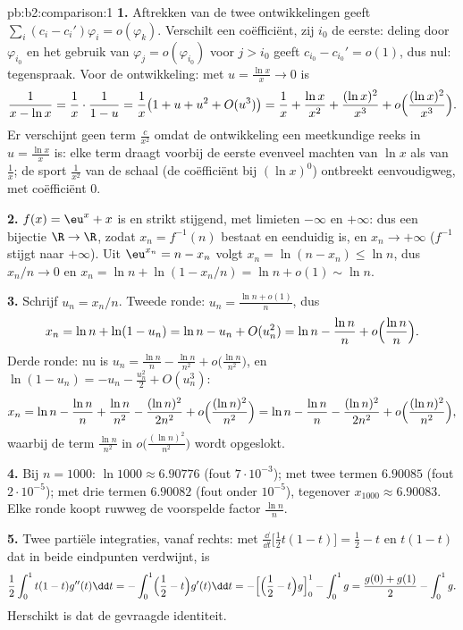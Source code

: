 \begin{solution}{pb:b2:comparison:1}
\textbf{1.} Aftrekken van de twee ontwikkelingen geeft $\sum_i (c_i
- c_i')\varphi_i = o(\varphi_k)$. Verschilt een coëfficiënt, zij
$i_0$ de eerste: deling door $\varphi_{i_0}$ en het gebruik van
$\varphi_j = o(\varphi_{i_0})$ voor $j > i_0$ geeft $c_{i_0} -
c_{i_0}' = o(1)$, dus nul: tegenspraak. Voor de ontwikkeling: met
$u = \frac{\ln x}x \to 0$ is
\[
\frac{1}{x - \ln x} = \frac1x\cdot\frac{1}{1 - u}
= \frac1x\bigl(1 + u + u^2 + O(u^3)\bigr)
= \frac1x + \frac{\ln x}{x^2} + \frac{(\ln x)^2}{x^3} +
o\Bigl(\frac{(\ln x)^2}{x^3}\Bigr).
\]
Er verschijnt geen term $\frac c{x^2}$ omdat de ontwikkeling een
meetkundige reeks in $u = \frac{\ln x}{x}$ is: elke term draagt
voorbij de eerste evenveel machten van $\ln x$ als van $\frac1x$;
de sport $\frac1{x^2}$ van de schaal (de coëfficiënt bij $(\ln
x)^0$) ontbreekt eenvoudigweg, met coëfficiënt $0$.

\textbf{2.} $f(x) = \eu^x + x$ is  en strikt stijgend, met
limieten $-\infty$ en $+\infty$: dus een bijectie $\R \to \R$,
zodat $x_n = f^{-1}(n)$ bestaat en eenduidig is, en $x_n \to
+\infty$ ($f^{-1}$ stijgt naar $+\infty$). Uit $\eu^{x_n} = n -
x_n$ volgt $x_n = \ln(n - x_n) \leq \ln n$, dus $x_n/n \to 0$ en
$x_n = \ln n + \ln(1 - x_n/n) = \ln n + o(1) \sim \ln n$.

\textbf{3.} Schrijf $u_n = x_n/n$. Tweede ronde: $u_n = \frac{\ln n
+ o(1)}{n}$, dus
\[
x_n = \ln n + \ln(1 - u_n) = \ln n - u_n + O(u_n^2)
= \ln n - \frac{\ln n}{n} + o\Bigl(\frac{\ln n}n\Bigr).
\]
Derde ronde: nu is $u_n = \frac{\ln n}{n} - \frac{\ln n}{n^2} +
o\bigl(\frac{\ln n}{n^2}\bigr)$, en $\ln(1 - u_n) = -u_n -
\frac{u_n^2}2 + O(u_n^3)$:
\[
x_n = \ln n - \frac{\ln n}n + \frac{\ln n}{n^2}
- \frac{(\ln n)^2}{2n^2} + o\Bigl(\frac{(\ln
n)^2}{n^2}\Bigr)
= \ln n - \frac{\ln n}{n} - \frac{(\ln n)^2}{2n^2} +
o\Bigl(\frac{(\ln n)^2}{n^2}\Bigr),
\]
waarbij de term $\frac{\ln n}{n^2}$ in $o\bigl(\frac{(\ln
n)^2}{n^2}\bigr)$ wordt opgeslokt.

\textbf{4.} Bij $n = 1000$: $\ln 1000 \approx 6.90776$ (fout
$7\cdot10^{-3}$); met twee termen $6.90085$ (fout
$2\cdot10^{-5}$); met drie termen $6.90082$ (fout onder
$10^{-5}$), tegenover $x_{1000} \approx 6.90083$. Elke ronde koopt
ruwweg de voorspelde factor $\frac{\ln n}{n}$.

\textbf{5.} Twee partiële integraties, vanaf rechts: met
$\frac{\dd}{\dd t}\bigl[\tfrac12t(1-t)\bigr] = \tfrac12 - t$ en
$t(1-t)$ dat in beide eindpunten verdwijnt, is
\[
\frac12\int_0^1 t(1-t)g''(t)\dd t
= -\int_0^1\Bigl(\frac12 - t\Bigr)g'(t)\dd t
= -\Bigl[\Bigl(\frac12 - t\Bigr)g\Bigr]_0^1 - \int_0^1 g
= \frac{g(0) + g(1)}2 - \int_0^1 g .
\]
Herschikt is dat de gevraagde identiteit.


\end{solution}
